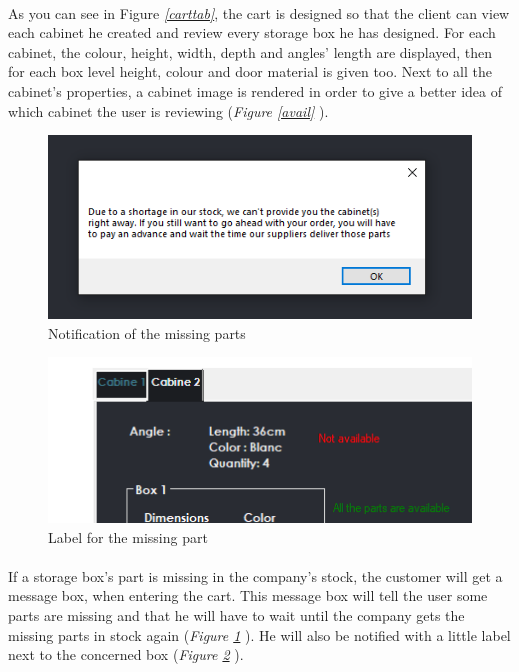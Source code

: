 \documentclass[12pt,oneside]{report}
\begin{document}
    	\paragraph{}
        As you can see in Figure \textit{\ref{carttab}}, the cart is designed so that the client can view each cabinet he created and review every storage box he has designed. For each cabinet, the colour, height, width, depth and angles’ length are displayed, then for each box level height, colour and door material is given too. Next to all the cabinet’s properties, a cabinet image is rendered in order to give a better idea of which cabinet the user is reviewing (\textit{Figure \ref{avail}} ).
        
        \begin{figure}[h!]
            \centering
    		\includegraphics[scale=0.7]{Figures/ShortageMessage.PNG}
    		\caption{Notification of the missing parts}
    		\label{shortage}
    	\end{figure}
    	
        \begin{figure}[h!]
            \centering
    		\includegraphics[scale=0.7]{Figures/UnavailibilityLabel.PNG}
    		\caption{Label for the missing part}
    		\label{unavail}
    	\end{figure}
        
        \paragraph{}
        If a storage box’s part is missing in the company’s stock, the customer will get a message box, when entering the cart. This message box will tell the user some parts are missing and that he will have to wait until the company gets the missing parts in stock again (\textit{Figure \ref{shortage}} ). He will also be notified with a little label next to the concerned box (\textit{Figure \ref{unavail}} ). 
        
\end{document}
